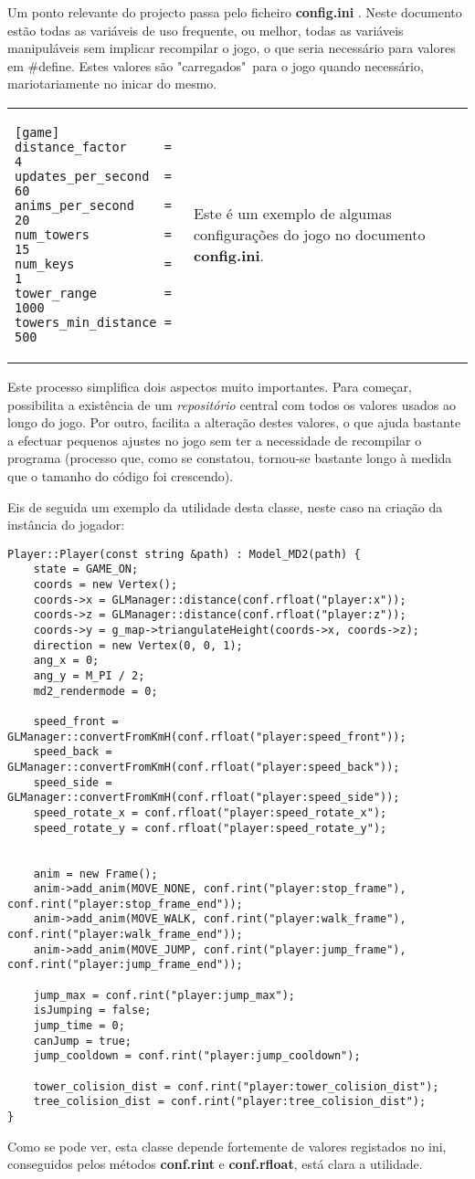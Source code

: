 

Um ponto relevante do projecto passa pelo ficheiro {\bf config.ini} . Neste documento estão todas as variáveis de uso frequente, ou melhor, todas as variáveis manipuláveis sem implicar recompilar o jogo, o que seria necessário para valores em \#define. Estes valores são "carregados"\ para o jogo quando necessário, mariotariamente no inicar do mesmo.

\-
\begin{center}
\begin{tabular} {l | p{10cm}}
\begin{lstlisting}
[game]
distance_factor		= 4
updates_per_second	= 60
anims_per_second	= 20
num_towers			= 15
num_keys			= 1
tower_range			= 1000
towers_min_distance = 500
\end{lstlisting} 
& 
Este é um exemplo de algumas configurações do jogo no documento {\bf config.ini}. \\
\end{tabular}
\end{center}

Este processo simplifica dois aspectos muito importantes. Para começar, possibilita a existência de um \emph{repositório} central com todos os valores usados ao longo do jogo. Por outro, facilita a alteração destes valores, o que ajuda bastante a efectuar pequenos ajustes no jogo sem ter a necessidade de recompilar o programa (processo que, como se constatou, tornou-se bastante longo à medida que o tamanho do código foi crescendo).

Eis de seguida um exemplo da utilidade desta classe, neste caso na criação da instância do jogador:

\begin{lstlisting}[caption=Construtor do jogador]
Player::Player(const string &path) : Model_MD2(path) {
	state = GAME_ON;
	coords = new Vertex();
	coords->x = GLManager::distance(conf.rfloat("player:x"));
	coords->z = GLManager::distance(conf.rfloat("player:z"));
	coords->y = g_map->triangulateHeight(coords->x, coords->z);
	direction = new Vertex(0, 0, 1);
	ang_x = 0;
	ang_y = M_PI / 2;
	md2_rendermode = 0;

	speed_front = GLManager::convertFromKmH(conf.rfloat("player:speed_front"));
	speed_back = GLManager::convertFromKmH(conf.rfloat("player:speed_back"));
	speed_side = GLManager::convertFromKmH(conf.rfloat("player:speed_side"));
	speed_rotate_x = conf.rfloat("player:speed_rotate_x");
	speed_rotate_y = conf.rfloat("player:speed_rotate_y");


	anim = new Frame();
	anim->add_anim(MOVE_NONE, conf.rint("player:stop_frame"), conf.rint("player:stop_frame_end"));
	anim->add_anim(MOVE_WALK, conf.rint("player:walk_frame"), conf.rint("player:walk_frame_end"));
	anim->add_anim(MOVE_JUMP, conf.rint("player:jump_frame"), conf.rint("player:jump_frame_end"));

	jump_max = conf.rint("player:jump_max");
	isJumping = false;
	jump_time = 0;
	canJump = true;
	jump_cooldown = conf.rint("player:jump_cooldown");

	tower_colision_dist = conf.rint("player:tower_colision_dist");
	tree_colision_dist = conf.rint("player:tree_colision_dist");
}
\end{lstlisting}

Como se pode ver, esta classe depende fortemente de valores registados no ini, conseguidos pelos métodos \textbf{conf.rint} e \textbf{conf.rfloat}, está clara a utilidade.
